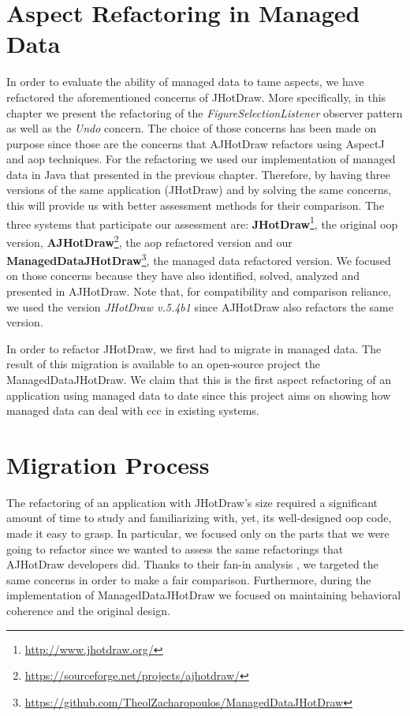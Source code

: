 \section{Aspect Refactoring in Managed Data}
In order to evaluate the ability of managed data to tame aspects, we have refactored the aforementioned concerns of JHotDraw.
More specifically, in this chapter we present the refactoring of the \textit{FigureSelectionListener} observer pattern as well as the \textit{Undo} concern.
The choice of those concerns has been made on purpose since those are the concerns that AJHotDraw refactors using AspectJ and \ac{aop} techniques.
For the refactoring we used our implementation of managed data in Java that presented in the previous chapter.
Therefore, by having three versions of the same application (JHotDraw) and by solving the same concerns, this will provide us with better assessment methods for their comparison.
The three systems that participate our assessment are: \textbf{JHotDraw}\footnote{\url{http://www.jhotdraw.org/}}, the original \ac{oop} version, \textbf{AJHotDraw}\footnote{\url{https://sourceforge.net/projects/ajhotdraw/}}, the \ac{aop} refactored version and our \textbf{ManagedDataJHotDraw}\footnote{\url{https://github.com/TheolZacharopoulos/ManagedDataJHotDraw}}, the managed data refactored version.
We focused on those concerns because they have also identified, solved, analyzed and presented in AJHotDraw.
Note that, for compatibility and comparison reliance, we used the version \textit{JHotDraw v.5.4b1} since AJHotDraw also refactors the same version.

In order to refactor JHotDraw, we first had to migrate in managed data.
The result of this migration is available to an open-source project the ManagedDataJHotDraw.
We claim that this is the first aspect refactoring of an application using managed data to date since this project aims on showing how managed data can deal with \ac{ccc} in existing systems.

\section{Migration Process}
The refactoring of an application with JHotDraw's size required a significant amount of time to study and familiarizing with, yet, its well-designed \ac{oop} code, made it easy to grasp.
In particular, we focused only on the parts that we were going to refactor since we wanted to assess the same refactorings that AJHotDraw developers \cite{marinajhotdraw} did.
Thanks to their fan-in analysis \cite{marin2004identifying}, we targeted the same concerns in order to make a fair comparison.
Furthermore, during the implementation of ManagedDataJHotDraw we focused on maintaining behavioral coherence and the original design.

